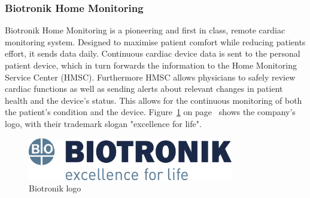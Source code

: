 \documentclass[12pt,]{article}
\numberwithin{figure}{section}
\begin{document}
\subsubsection{Biotronik Home Monitoring}
Biotronik Home Monitoring is a pioneering and first in class, remote cardiac monitoring system. Designed to maximise patient comfort while reducing patients effort, it sends data daily. Continuous cardiac device data is sent to the personal patient device, which in turn forwards the information to the Home Monitoring Service Center (HMSC). Furthermore HMSC allows physicians to safely review cardiac functions as well as sending alerts about relevant changes in patient health and the device’s status. This allows for the continuous monitoring of both the patient’s condition and the device. Figure~\ref{fig:3} on page~\pageref{fig:3} shows the company's logo, with their trademark slogan "excellence for life".
\begin{figure}[h]
  	\begin{center}
    	\includegraphics[width=0.8\textwidth]{3}
  	\end{center}
  	\caption{Biotronik logo \cite{BIO}}
	\label{fig:3}
\end{figure}
\end{document}
